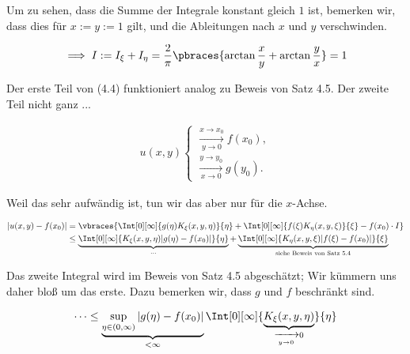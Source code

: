 \begin{solution}
  Um zu sehen, dass die Summe der Integrale konstant gleich $1$ ist, bemerken wir, dass dies für $x := y := 1$ gilt, und die Ableitungen nach $x$ und $y$ verschwinden.

  \begin{align*}
    \implies
    I
    :=
    I_\xi + I_\eta
    =
    \frac{2}{\pi}
    \pbraces
    {
      \arctan \frac{x}{y}
      +
      \arctan \frac{y}{x}
    }
    =
    1
  \end{align*}

  Der erste Teil von (4.4) funktioniert analog zu Beweis von Satz 4.5.
  Der zweite Teil nicht ganz ...

  \begin{align*}
    u(x, y)
    \begin{cases}
      \xrightarrow[y \to 0]{x \to x_0} f(x_0), \\
      \xrightarrow[x \to 0]{y \to y_0} g(y_0).
    \end{cases}
  \end{align*}

  Weil das sehr aufwändig ist, tun wir das aber nur für die $x$-Achse.

  \begin{align*}
    |u(x, y) - f(x_0)|
    & =
    \vbraces
    {
      \Int[0][\infty]
      {
        g(\eta)
        K_\xi(x, y, \eta)
      }{\eta}
      +
      \Int[0][\infty]
      {
        f(\xi)
        K_\eta(x, y, \xi)
      }{\xi}
      -
      f(x_0) \cdot I
    } \\
    & \leq
    \underbrace
    {
      \Int[0][\infty]
      {
        K_\xi(x, y, \eta)
        |g(\eta) - f(x_0)|
      }{\eta}
    }_{\cdots}
    +
    \underbrace
    {
      \Int[0][\infty]
      {
        K_\eta(x, y, \xi)
        |f(\xi) - f(x_0)|
      }{\xi}
    }_{
      \text{siehe Beweis von Satz 5.4}
    }
  \end{align*}

  Das zweite Integral wird im Beweis von Satz 4.5 abgeschätzt;
  Wir kümmern uns daher bloß um das erste.
  Dazu bemerken wir, dass $g$ und $f$ beschränkt sind.

  \begin{align*}
    \cdots
    \leq
    \underbrace
    {
      \sup_{\eta \in (0, \infty)}
      |g(\eta) - f(x_0)|
    }_{
      < \infty
    }
    \Int[0][\infty]
    {
      \underbrace
      {
        K_\xi(x, y, \eta)
      }_{
        \xrightarrow[y \to 0]{} 0
      }
    }{\eta}
  \end{align*}


\end{solution}
